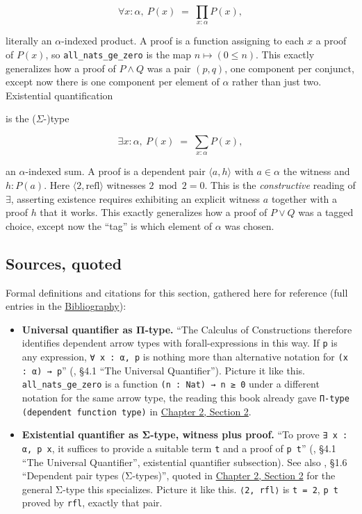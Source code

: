 \[
\forall x{:}\alpha,\ P(x) \;=\; \prod_{x : \alpha} P(x),
\]

literally an \(\alpha\)-indexed product. A proof is a function assigning to each \(x\) a proof of \(P(x)\), so \texttt{all\_\allowbreak{}nats\_\allowbreak{}ge\_\allowbreak{}zero} is the map \(n \mapsto (0
\le n)\). This exactly generalizes how a proof of \(P \wedge Q\) was a pair \((p, q)\), one component per conjunct, except now there is one component per element of \(\alpha\) rather than just two. Existential quantification

is the (\(\Sigma\)-)type

\[
\exists x{:}\alpha,\ P(x) \;=\; \sum_{x : \alpha} P(x),
\]

an \(\alpha\)-indexed sum. A proof is a dependent pair \(\langle a, h\rangle\) with \(a \in \alpha\) the witness and \(h : P(a)\). Here \(\langle 2,
\mathrm{refl}\rangle\) witnesses \(2 \bmod 2 = 0\). This is the \emph{constructive} reading of \(\exists\), asserting existence requires exhibiting an explicit witness \(a\) together with a proof \(h\) that it works. This exactly generalizes how a proof of \(P \vee Q\) was a tagged choice, except now the ``tag'' is which element of \(\alpha\) was chosen.

\subsection{Sources, quoted}\label{sec:04-propositions-and-proofs:06-quantifiers:2}

Formal definitions and citations for this section, gathered here for reference (full entries in the \hyperref[sec:root:bibliography:1]{Bibliography}):

\begin{itemize}
\tightlist
\item
  \textbf{Universal quantifier as Π-type.} ``The Calculus of Constructions therefore identifies dependent arrow types with forall-expressions in this way. If \texttt{p} is any expression, \texttt{∀ x : α, p} is nothing more than alternative notation for \texttt{(x : α) → p}'' (\cite{TPIL4}, §4.1 ``The Universal Quantifier''). Picture it like this. \texttt{all\_\allowbreak{}nats\_\allowbreak{}ge\_\allowbreak{}zero} is a function \texttt{(n : Nat) → n ≥ 0} under a different notation for the same arrow type, the reading this book already gave \texttt{Π-\allowbreak{}type (dependent function type)} in \hyperref[sec:02-terminology-and-coc:02-pi-sigma-and-coc:1]{Chapter 2, Section 2}.
\item
  \textbf{Existential quantifier as Σ-type, witness plus proof.} ``To prove \texttt{∃ x : α, p x}, it suffices to provide a suitable term \texttt{t} and a proof of \texttt{p t}'' (\cite{TPIL4}, §4.1 ``The Universal Quantifier'', existential quantifier subsection). See also \cite{HoTT2013}, §1.6 ``Dependent pair types (Σ-types)'', quoted in \hyperref[sec:02-terminology-and-coc:02-pi-sigma-and-coc:1]{Chapter 2, Section 2} for the general Σ-type this specializes. Picture it like this. \texttt{⟨2, rfl⟩} is \texttt{t = 2}, \texttt{p t} proved by \texttt{rfl}, exactly that pair.
\end{itemize}
